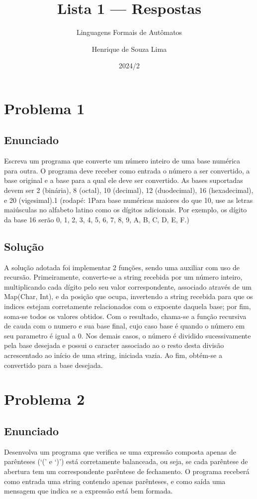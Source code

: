 \documentclass[a4paper, 11pt]{scrartcl}
\title{Lista 1 --- Respostas}
\subtitle{Linguagens Formais de Autômatos}
\author{Henrique de Souza Lima}
\date{2024/2}
\begin{document}
\maketitle

\section*{Problema 1}

\subsection*{Enunciado}
Escreva um programa que converte um número inteiro de uma base numérica para outra. O
programa deve receber como entrada o número a ser convertido, a base original e a base para a
qual ele deve ser convertido. As bases suportadas devem ser 2 (binária), 8 (octal), 10 (decimal),
12 (duodecimal), 16 (hexadecimal), e 20 (vigesimal).1 (rodapé: 1Para base numéricas maiores do que 10, 
use as letras maiúsculas no alfabeto latino como os dígitos adicionais. Por exemplo, 
os dígito da base 16 serão {0, 1, 2, 3, 4, 5, 6, 7, 8, 9, A, B, C, D, E, F}.)

\subsection*{Solução}
A solução adotada foi implementar 2 funções, sendo uma auxiliar com uso de recursão. 
Primeiramente, converte-se a string recebida por um número inteiro, multiplicando
cada dígito pelo seu valor correspondente, associado através de um Map(Char, Int),
e da posição que ocupa, invertendo a string recebida para que os indices estejam corretamente
relacionados com o expoente daquela base; por fim, soma-se todos os valores obtidos. Com o
resultado, chama-se a função recursiva de cauda com o numero e sua base final, cujo caso base é
quando o número em seu parametro é igual a 0. Nos demais casos, o número é dividido 
sucessivamente pela base desejada e possui o caracter associado ao o resto desta divisão acrescentado 
ao início de uma string, iniciada vazia. Ao fim, obtém-se a convertido para a base desejada.  

\section*{Problema 2}

\subsection*{Enunciado}
Desenvolva um programa que verifica se uma expressão composta apenas de parênteses (‘(’ e
‘)’) está corretamente balanceada, ou seja, se cada parêntese de abertura tem um correspondente
parêntese de fechamento. O programa receberá como entrada uma string contendo apenas
parênteses, e como saída uma mensagem que indica se a expressão está bem formada.
\end{document}
